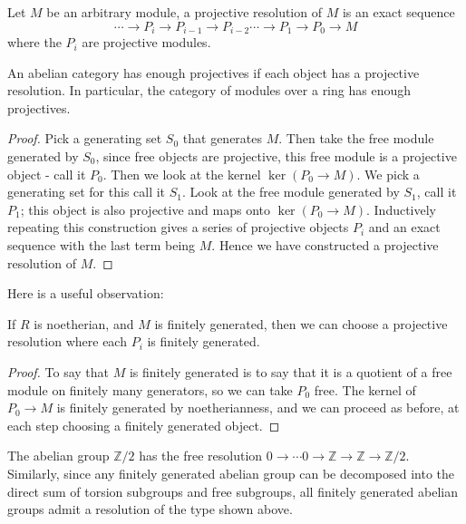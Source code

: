 \begin{definition} Let $M$ be an arbitrary module, a projective
resolution of
$M$ is an exact sequence
\begin{equation} \cdots\rightarrow P_i\rightarrow
P_{i-1}\rightarrow
P_{i-2}\cdots\rightarrow P_1\rightarrow P_0\rightarrow M
\end{equation} where
the $P_i$ are projective modules. \end{definition}


\begin{theorem}An abelian category has enough projectives if
each object has a
projective resolution. In particular, the category of modules
over a ring has
enough projectives. \end{theorem}
\begin{proof} Pick a generating set $S_0$ that generates $M$.
Then take the free
module generated by $S_0$, since free objects are projective,
this free module
is a projective object - call it $P_0$. Then we look at the
kernel
$\ker(P_0\rightarrow M)$. We pick a generating set for this call
it $S_1$. Look
at the free module generated by $S_1$, call it $P_1$; this
object is also
projective and maps onto $\ker(P_0\rightarrow M)$. Inductively
repeating this
construction gives a series of projective objects $P_i$ and an
exact sequence
with the last term being $M$. Hence we have constructed a
projective resolution
of $M$. \end{proof}

Here is a useful observation:
\begin{proposition}
If $R$ is noetherian, and $M$ is finitely generated, then we can
choose a
projective resolution where each $P_i$ is finitely generated.
\end{proposition}
\begin{proof}
To say that $M$ is finitely generated is to say that it is a
quotient of a free module on
finitely many generators, so we can take $P_0$ free. The kernel
of $P_0 \to M$
is finitely generated by noetherianness, and we can proceed as
before, at each step
choosing a finitely generated object.
\end{proof}
\begin{example} The abelian group $\mathbb{Z}/2$ has the free
resolution $0\rightarrow\cdots
0\rightarrow\mathbb{Z}\rightarrow\mathbb{Z}\rightarrow\mathbb{Z}/2$.
Similarly, since any finitely generated abelian group can be
decomposed into the direct sum of torsion subgroups and free
subgroups, all finitely generated abelian groups admit a
resolution of the type shown above.\end{example}

